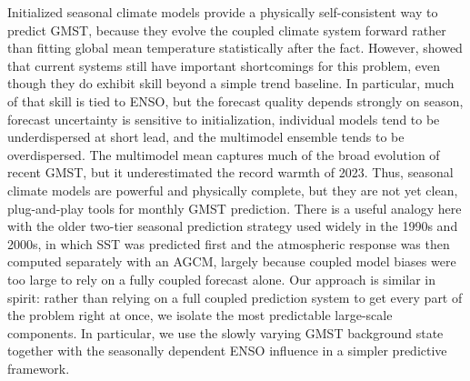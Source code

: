 \documentclass[draft]{agujournal2019}
\begin{document}
Initialized seasonal climate models provide a physically
  self-consistent way to predict GMST, because they
  evolve the coupled climate system forward rather than fitting global
  mean temperature statistically after the fact. However,  showed that current systems
  still have important shortcomings for this problem, even though they
  do exhibit skill beyond a simple trend baseline. In particular, much of that skill is tied to ENSO, but the
  forecast quality depends strongly on season, forecast uncertainty is
  sensitive to initialization, individual models tend to be
  underdispersed at short lead, and the multimodel ensemble tends to
  be overdispersed. The multimodel mean captures much of the broad evolution of
  recent GMST, but it underestimated the record
  warmth of 2023. Thus, seasonal climate models are powerful and physically
  complete, but they are not yet clean, plug-and-play tools for
  monthly GMST prediction. There is a useful analogy here with the older two-tier seasonal
  prediction strategy used widely in the 1990s and 2000s, in which SST
  was predicted first and the atmospheric response was then computed
  separately with an AGCM, largely because coupled model biases were
  too large to rely on a fully coupled forecast alone. Our approach is similar in spirit: rather than relying on a full
  coupled prediction system to get every part of the problem right at
  once, we isolate the most predictable large-scale components. In particular, we use the slowly varying GMST
  background state together with the seasonally dependent ENSO
  influence in a simpler predictive framework.
\end{document}
